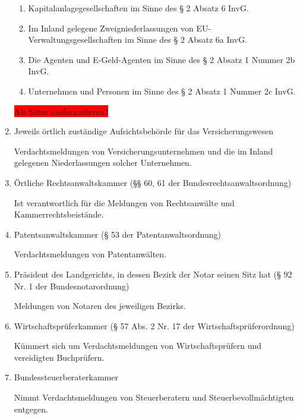 \documentclass{article}
\begin{document}
\begin{enumerate}
\begin{enumerate}
                        \item

                            Kapitalanlagegesellschaften im Sinne des § 2 Absatz 6 InvG.

                        \item

                            Im Inland gelegene Zweigniederlassungen von EU-
                            Verwaltungsgesellschaften im Sinne des § 2 Absatz 6a InvG.

                        \item

                            Die Agenten und E-Geld-Agenten im Sinne des § 2 Absatz 1 Nummer 2b InvG.

                        \item

                            Unternehmen und Personen im Sinne des § 2 Absatz 1 Nummer 2c InvG.

                    \end{enumerate}
                    \colorbox{red}{Als Sätze ausformulieren?}
                \item Jeweils örtlich zuständige Aufsichtsbehörde für das Versicherungswesen

                    Verdachtsmeldungen von Versicherungsunternehmen und die im Inland gelegenen Niederlassungen solcher Unternehmen.

                \item Örtliche Rechtsanwaltskammer (§§ 60, 61 der Bundesrechtsanwaltsordnung)

                    Ist verantwortlich für die Meldungen von Rechtsanwälte und Kammerrechtsbeistände.

                \item  Patentsanwaltskammer (§ 53 der Patentanwaltsordnung)
                    
                    Verdachtsmeldungen von Patentanwälten.

                \item Präsident des Landgerichts, in dessen Bezirk der Notar seinen Sitz hat (§ 92 Nr. 1 der Bundesnotarordnung)

                    Meldungen von Notaren des jeweiligen Bezirks.

                \item Wirtschaftsprüferkammer (§ 57 Abs. 2 Nr. 17 der Wirtschaftsprüferordnung)
                
                    Kümmert sich um Verdachtsmeldungen von Wirtschaftsprüfern und vereidigten Buchprüfern.

                \item Bundessteuerberaterkammer

                    Nimmt Verdachtsmeldungen von Steuerberatern und Steuerbevollmächtigten entgegen.

            \end{enumerate}
\end{document}

